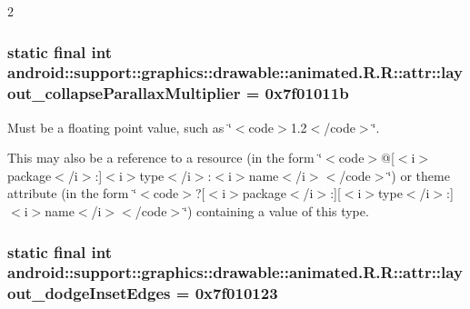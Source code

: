 2\hypertarget{classandroid_1_1support_1_1graphics_1_1drawable_1_1animated_1_1_r_1_1attr_e6a3acae3a08b57def4857596d91444c}{
\subsubsection[{layout\_\-collapseParallaxMultiplier}]{\setlength{\rightskip}{0pt plus 5cm}static final int android::support::graphics::drawable::animated.R.R::attr::layout\_\-collapseParallaxMultiplier = 0x7f01011b}}
\label{classandroid_1_1support_1_1graphics_1_1drawable_1_1animated_1_1_r_1_1attr_e6a3acae3a08b57def4857596d91444c}


Must be a floating point value, such as \char`\"{}$<$code$>$1.2$<$/code$>$\char`\"{}. 

This may also be a reference to a resource (in the form \char`\"{}$<$code$>$@\mbox{[}$<$i$>$package$<$/i$>$:\mbox{]}$<$i$>$type$<$/i$>$:$<$i$>$name$<$/i$>$$<$/code$>$\char`\"{}) or theme attribute (in the form \char`\"{}$<$code$>$?\mbox{[}$<$i$>$package$<$/i$>$:\mbox{]}\mbox{[}$<$i$>$type$<$/i$>$:\mbox{]}$<$i$>$name$<$/i$>$$<$/code$>$\char`\"{}) containing a value of this type. \hypertarget{classandroid_1_1support_1_1graphics_1_1drawable_1_1animated_1_1_r_1_1attr_1a54d0173e57f28454df62031200524a}{
\subsubsection[{layout\_\-dodgeInsetEdges}]{\setlength{\rightskip}{0pt plus 5cm}static final int android::support::graphics::drawable::animated.R.R::attr::layout\_\-dodgeInsetEdges = 0x7f010123}}
\label{classandroid_1_1support_1_1graphics_1_1drawable_1_1animated_1_1_r_1_1attr_1a54d0173e57f28454df62031200524a}


